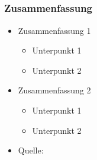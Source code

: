 \documentclass[compress]{beamer}
\begin{document}
\subsection*{}

\begin{frame}
	\frametitle{Zusammenfassung}

	\begin{itemize}
		\item Zusammenfassung 1
		\begin{itemize}
			\item Unterpunkt 1
			\item Unterpunkt 2
		\end{itemize}
		\item Zusammenfassung 2
		\begin{itemize}
			\item Unterpunkt 1
			\item Unterpunkt 2
		\end{itemize}
		\item Quelle: \cite{Quelle2012}
	\end{itemize}
\end{frame}
\end{document}
